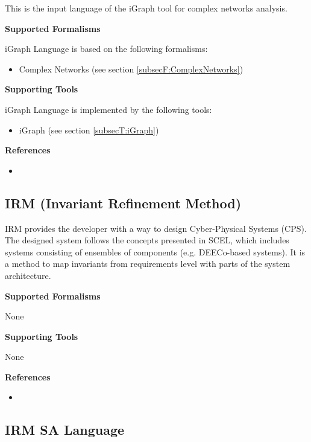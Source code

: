 This is the input language of the iGraph tool for complex networks analysis.

\textbf{Supported Formalisms}

iGraph Language is based on the following formalisms:
\begin{itemize}
	\item Complex Networks (see section \ref{subsecF:ComplexNetworks})
\end{itemize}


\textbf{Supporting Tools}

iGraph Language is implemented by the following tools:
\begin{itemize}
	\item iGraph (see section \ref{subsecT:iGraph})
\end{itemize}


\textbf{References}
\begin{itemize}
	
\item {}
\end{itemize}



\subsection{IRM (Invariant Refinement Method)}
\label{subsecL:IRM}


IRM provides the developer with a way to design  Cyber-Physical Systems (CPS). The designed system follows the concepts presented in SCEL, which includes systems consisting of ensembles of components (e.g. DEECo-based systems). It is a method to map invariants from requirements level with parts of the system architecture.

\textbf{Supported Formalisms}

None


\textbf{Supporting Tools}

None


\textbf{References}
\begin{itemize}
	
\item {}
\end{itemize}



\subsection{IRM SA Language}
\label{subsecL:IRM-SA-Language}


